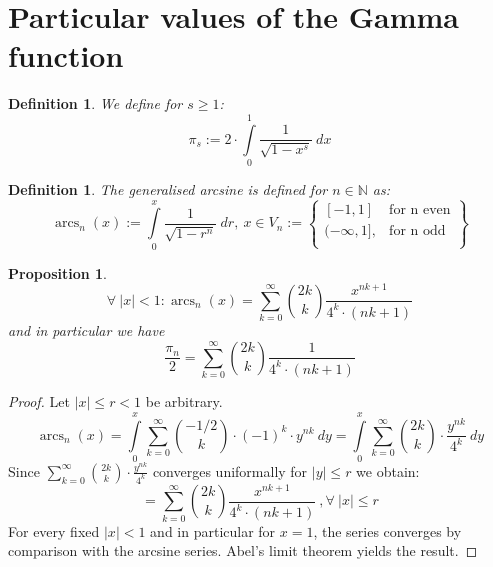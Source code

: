 \documentclass[sn-mathphys]{sn-jnl}%
\theoremstyle{thmstyleone}%
\newtheorem{proposition}[theorem]{Proposition}%
\theoremstyle{thmstyletwo}%
\theoremstyle{thmstylethree}%
\newtheorem{definition}[theorem]{Definition}%
\DeclareMathOperator{\arcs}{arcs}
\begin{document}
\section{Particular values of the Gamma function}\label{sec2}
\begin{definition}\label{def1}
We define for $s \geq 1$:
\begin{equation}
\pi_s := 2 \cdot \int \limits_{0}^{1} \frac{1}{\sqrt{1-x^s}} \ dx
\end{equation}
\end{definition}
\begin{definition}\label{df2}
The generalised arcsine is defined for $n \in \mathbb{N}$ as:
\begin{equation}
\arcs_{n}(x) := \int \limits_{0}^{x} \frac{1}{\sqrt{1-r^n}} \ dr, \ x \in V_n := \left\{\begin{array}{lr}
        [-1,1] & \text{for n even}\\
        (-\infty, 1], & \text{for n odd}\\
        \end{array}\right\}
\end{equation}
\end{definition}
\begin{proposition}\label{pr3}
\begin{equation}
\forall \ \lvert x \rvert < 1: \arcs_n(x) = \sum_{k=0}^{\infty} \binom{2k}{k} \frac{x^{nk+1}}{4^{k} \cdot (nk+1)}
\end{equation}
and in particular we have
\begin{equation}
\frac{\pi_n}{2} = \sum_{k=0}^{\infty} \binom{2k}{k} \frac{1}{4^{k} \cdot (nk+1)}
\end{equation}
\end{proposition}
\begin{proof}
Let $ \lvert x \rvert \leq r < 1$ be arbitrary.
\begin{equation*}
\arcs_n(x) = \int \limits_{0}^{x} \sum_{k=0}^{\infty} \binom{-1/2}{k} \cdot (-1)^{k} \cdot y^{nk} \ dy = \int \limits_{0}^{x} \sum_{k=0}^{\infty} \binom{2k}{k} \cdot \frac{y^{nk}}{4^{k}} \ dy
\end{equation*}
Since $\sum_{k=0}^{\infty} \binom{2k}{k} \cdot \frac{y^{nk}}{4^{k}}$ converges uniformally for $\lvert y \rvert \leq r$ we obtain:
\begin{equation*}
= \sum_{k=0}^{\infty} \binom{2k}{k} \frac{x^{nk+1}}{4^{k} \cdot (nk+1)} \ , \forall \ \lvert x \rvert \leq r
\end{equation*}
For every fixed $ \lvert x \rvert < 1$  and in particular for $x=1$, the series converges by comparison with the arcsine series. Abel's limit theorem yields the result.
\end{proof}
\end{document}
